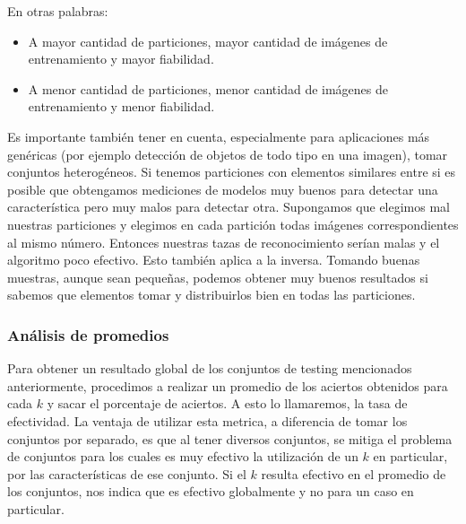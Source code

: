 En otras palabras:

\begin{itemize}
    \item A mayor cantidad de particiones, mayor cantidad de imágenes de entrenamiento y mayor fiabilidad.
    \item A menor cantidad de particiones, menor cantidad de imágenes de entrenamiento y menor fiabilidad.
\end{itemize}

Es importante también tener en cuenta, especialmente para aplicaciones más genéricas (por ejemplo detección de objetos de todo tipo en una imagen), tomar conjuntos heterogéneos. Si tenemos particiones con elementos similares entre si es posible que obtengamos mediciones de modelos muy buenos para detectar una característica pero muy malos para detectar otra. Supongamos que elegimos mal nuestras particiones y elegimos en cada partición todas imágenes correspondientes al mismo número. Entonces nuestras tazas de reconocimiento serían malas y el algoritmo poco efectivo. Esto también aplica a la inversa. Tomando buenas muestras, aunque sean pequeñas, podemos obtener muy buenos resultados si sabemos que elementos tomar y distribuirlos bien en todas las particiones.

\subsubsection{Análisis de promedios}

Para obtener un resultado global de los conjuntos de testing mencionados anteriormente, procedimos a realizar un promedio de los aciertos obtenidos para cada $k$ y sacar el porcentaje de aciertos. A esto lo llamaremos, la tasa de efectividad.
La ventaja de utilizar esta metrica, a diferencia de tomar los conjuntos por separado, es que al tener diversos conjuntos, se mitiga el problema de conjuntos para los cuales es muy efectivo la utilización de un $k$ en particular, por las características de ese conjunto. Si el $k$ resulta efectivo en el promedio de los conjuntos, nos indica que es efectivo globalmente y no para un caso en particular.

